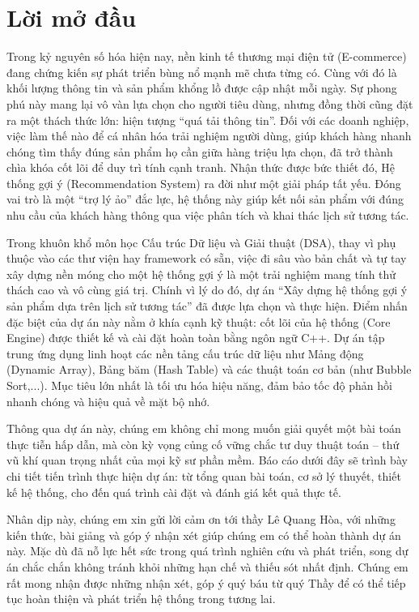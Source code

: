 \documentclass{report}
\begin{document}
\newpage
\chapter*{Lời mở đầu}
\thispagestyle{empty}

Trong kỷ nguyên số hóa hiện nay, nền kinh tế thương mại điện tử (E-commerce) đang chứng kiến sự phát triển bùng nổ mạnh mẽ chưa từng có. Cùng với đó là khối lượng thông tin và sản phẩm khổng lồ được cập nhật mỗi ngày. Sự phong phú này mang lại vô vàn lựa chọn cho người tiêu dùng, nhưng đồng thời cũng đặt ra một thách thức lớn: hiện tượng ``quá tải thông tin''. Đối với các doanh nghiệp, việc làm thế nào để cá nhân hóa trải nghiệm người dùng, giúp khách hàng nhanh chóng tìm thấy đúng sản phẩm họ cần giữa hàng triệu lựa chọn, đã trở thành chìa khóa cốt lõi để duy trì tính cạnh tranh. Nhận thức được bức thiết đó, Hệ thống gợi ý (Recommendation System) ra đời như một giải pháp tất yếu. Đóng vai trò là một ``trợ lý ảo'' đắc lực, hệ thống này giúp kết nối sản phẩm với đúng nhu cầu của khách hàng thông qua việc phân tích và khai thác lịch sử tương tác.

Trong khuôn khổ môn học Cấu trúc Dữ liệu và Giải thuật (DSA), thay vì phụ thuộc vào các thư viện hay framework có sẵn, việc đi sâu vào bản chất và tự tay xây dựng nền móng cho một hệ thống gợi ý là một trải nghiệm mang tính thử thách cao và vô cùng giá trị. Chính vì lý do đó, dự án ``Xây dựng hệ thống gợi ý sản phẩm dựa trên lịch sử tương tác'' đã được lựa chọn và thực hiện. Điểm nhấn đặc biệt của dự án này nằm ở khía cạnh kỹ thuật: cốt lõi của hệ thống (Core Engine) được thiết kế và cài đặt hoàn toàn bằng ngôn ngữ C++. Dự án tập trung ứng dụng linh hoạt các nền tảng cấu trúc dữ liệu như Mảng động (Dynamic Array), Bảng băm (Hash Table) và các thuật toán cơ bản (như Bubble Sort,...). Mục tiêu lớn nhất là tối ưu hóa hiệu năng, đảm bảo tốc độ phản hồi nhanh chóng và hiệu quả về mặt bộ nhớ.

Thông qua dự án này, chúng em không chỉ mong muốn giải quyết một bài toán thực tiễn hấp dẫn, mà còn kỳ vọng củng cố vững chắc tư duy thuật toán -- thứ vũ khí quan trọng nhất của mọi kỹ sư phần mềm. Báo cáo dưới đây sẽ trình bày chi tiết tiến trình thực hiện dự án: từ tổng quan bài toán, cơ sở lý thuyết, thiết kế hệ thống, cho đến quá trình cài đặt và đánh giá kết quả thực tế.

Nhân dịp này, chúng em xin gửi lời cảm ơn tới thầy Lê Quang Hòa, với những kiến thức, bài giảng và góp ý nhận xét giúp chúng em có thể hoàn thành dự án này. Mặc dù đã nỗ lực hết sức trong quá trình nghiên cứu và phát triển, song dự án chắc chắn không tránh khỏi những hạn chế và thiếu sót nhất định. Chúng em rất mong nhận được những nhận xét, góp ý quý báu từ quý Thầy để có thể tiếp tục hoàn thiện và phát triển hệ thống trong tương lai.
\end{document}

